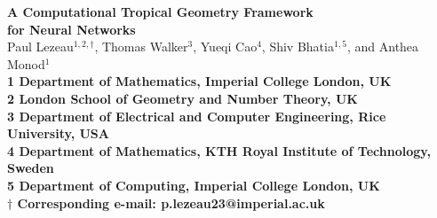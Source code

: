 \documentclass[10pt]{article}
\theoremstyle{definition}
\theoremstyle{remark}
\begin{document}
\def\spacingset#1{\renewcommand{\baselinestretch}%
{#1}\small\normalsize} \spacingset{1}


\begin{flushleft}
{\Large{\textbf{A Computational Tropical Geometry Framework\\ for Neural Networks}}}
\newline
\\
Paul Lezeau$^{1,2,\dagger}$, Thomas Walker$^3$, Yueqi Cao$^{4}$, 
Shiv Bhatia$^{1,5}$, and Anthea Monod$^{1}$
\\
\bigskip
\bf{1} Department of Mathematics, Imperial College London, UK
\\
\bf{2} London School of Geometry and Number Theory, UK
\\
\bf{3} Department of Electrical and Computer Engineering, Rice University, USA
\\
\bf{4} Department of Mathematics, KTH Royal Institute of Technology, Sweden
\\
\bf{5} Department of Computing, Imperial College London, UK
\\
\bigskip
$\dagger$ Corresponding e-mail: p.lezeau23@imperial.ac.uk
\end{flushleft}


\end{document}
